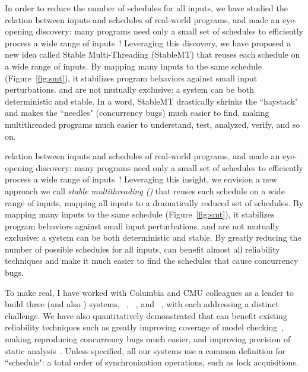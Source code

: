 In order to reduce the number of schedules for all inputs, we have studied the
relation between inputs and schedules of real-world programs, and made an
eye-opening discovery: many programs need only a small set of schedules to
efficiently process a wide range of inputs~\cite{smt:cacm}! Leveraging this
discovery, we have proposed a new idea called Stable Multi-Threading (StableMT)
that reuses each schedule on a wide range of inputs. By mapping many inputs to
the same schedule (Figure~\ref{fig:smt}), it stabilizes program behaviors
against small input perturbations. \smt and \dmt are not mutually exclusive: a
system can be both deterministic and stable. In a word, StableMT drastically
shrinks the ``haystack" and makes the ``needles" (concurrency bugs) much easier
to find, making multithreaded programs much easier to understand, test,
analyzed, verify, and so on.

relation between inputs and schedules of real-world programs, and made an
eye-opening discovery: many programs need only a small set of schedules to
efficiently process a wide range of inputs~\cite{smt:cacm}! Leveraging this
insight, we envision a new approach we call \emph{stable multithreading (\smt)}
that reuses each schedule on a wide range of inputs, mapping all inputs to a
dramatically reduced set of schedules. By mapping many inputs to the same
schedule (Figure~\ref{fig:smt}), it stabilizes program behaviors against small
input perturbations. \smt and \dmt are not mutually exclusive: a system can be
both deterministic and stable. By greatly reducing the number of possible
schedules for all inputs, \smt can benefit almost all reliability techniques and
make it much easier to find the schedules that cause concurrency bugs. 

To make \smt real, I have worked with Columbia and CMU colleagues as a leader to
build three \smt (and also \dmt) systems, \tern~\cite{cui:tern:osdi10},
\peregrine~\cite{peregrine:sosp11}, and \parrot~\cite{parrot:sosp13}, with each
addressing a distinct challenge. We have also quantitatively demonstrated that
\smt can benefit existing reliability techniques such as greatly improving
coverage of model checking~\cite{parrot:sosp13}, making reproducing concurrency
bugs much easier, and improving precision of static analysis~\cite{wu:pldi12}.
Unless specified, all our systems use a common definition for ``schedule": a
total order of synchronization operations, such as lock acquisitions.

